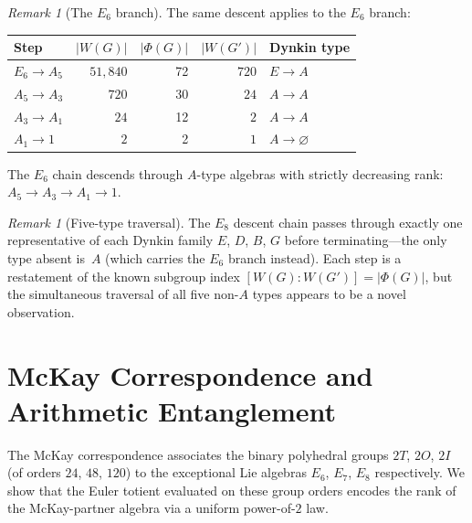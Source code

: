 \documentclass[11pt]{amsart}
\theoremstyle{plain}
\theoremstyle{definition}
\theoremstyle{remark}
\newtheorem{remark}[theorem]{Remark}
\renewcommand{\Phi}{\varPhi}
\begin{document}
\begin{remark}[The $E_6$ branch]\label{rem:E6-descent}
The same descent applies to the $E_6$ branch:
\begin{center}
\renewcommand{\arraystretch}{1.15}
\begin{tabular}{@{}lrrrl@{}}
\toprule
Step & $|W(G)|$ & $|\Phi(G)|$ & $|W(G')|$ & Dynkin type \\
\midrule
$E_6 \to A_5$  & $51{,}840$ & 72 & $720$ & $E \to A$ \\
$A_5 \to A_3$  & $720$      & 30 & $24$  & $A \to A$ \\
$A_3 \to A_1$  & $24$       & 12 & $2$   & $A \to A$ \\
$A_1 \to 1$    & $2$        & 2  & $1$   & $A \to \varnothing$ \\
\bottomrule
\end{tabular}
\end{center}
The $E_6$ chain descends through $A$-type algebras with strictly
decreasing rank: $A_5 \to A_3 \to A_1 \to 1$.
\end{remark}

\begin{remark}[Five-type traversal]\label{rem:five-type}
The $E_8$ descent chain passes through exactly one representative
of each Dynkin family $E$, $D$, $B$, $G$ before terminating---the
only type absent is~$A$ (which carries the $E_6$ branch instead).
Each step is a restatement of the known subgroup index
$[W(G) : W(G')] = |\Phi(G)|$, but the simultaneous traversal of all
five non-$A$ types appears to be a novel observation.
\end{remark}

\section{McKay Correspondence and Arithmetic Entanglement}%
\label{sec:mckay-entanglement}

The McKay correspondence associates the binary polyhedral groups
$2T$, $2O$, $2I$ (of orders $24$, $48$, $120$) to the exceptional
Lie algebras $E_6$, $E_7$, $E_8$ respectively.  We show that the
Euler totient evaluated on these group orders encodes the rank of
the McKay-partner algebra via a uniform power-of-$2$ law.
\end{document}
